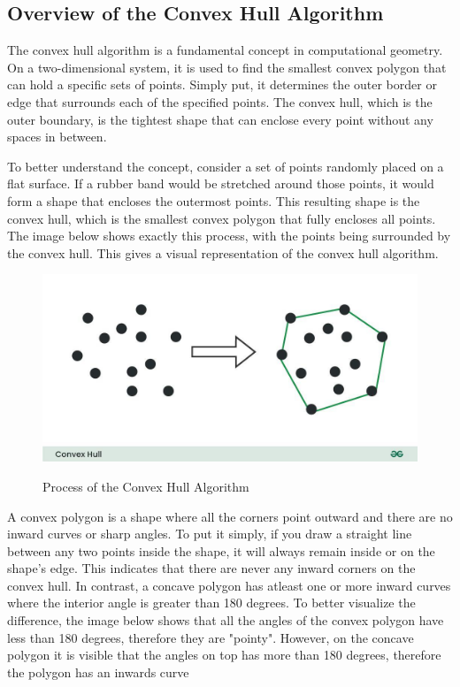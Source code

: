     \subsection{Overview of the Convex Hull Algorithm}
    The convex hull algorithm is a fundamental concept in computational geometry. On a two-dimensional system, it is used to find the smallest convex polygon that can hold a specific sets of points. Simply put, it determines the outer border or edge that surrounds each of the specified points. The convex hull, which is the outer boundary, is the tightest shape that can enclose every point without any spaces in between. \newline
    
    To better understand the concept, consider a set of points randomly placed on a flat surface. If a rubber band would be stretched around those points, it would form a shape that encloses the outermost points. This resulting shape is the convex hull, which is the smallest convex polygon that fully encloses all points. The image below shows exactly this process, with the points being surrounded by the convex hull. This gives a visual representation of the convex hull algorithm.
    \begin{figure} [H]
        \centering
        \includegraphics [width=1\textwidth] {images/andreas/areaBorders/convexHull.jpg}
        \caption{Process of the Convex Hull Algorithm}
        \cite{Andi:convexHullPic}
    \end{figure} 
    \blankLine 
    A convex polygon is a shape where all the corners point outward and there are no inward curves or sharp angles. To put it simply, if you draw a straight line between any two points inside the shape, it will always remain inside or on the shape's edge. This indicates that there are never any inward corners on the convex hull. In contrast, a concave polygon has atleast one or more inward curves where the interior angle is greater than 180 degrees. \newline
    To better visualize the difference, the image below shows that all the angles of the convex polygon have less than 180 degrees, therefore they are "pointy". However, on the concave polygon it is visible that the angles on top has more than 180 degrees, therefore the polygon has an inwards curve \autocite{Andi:convexPolygon}

